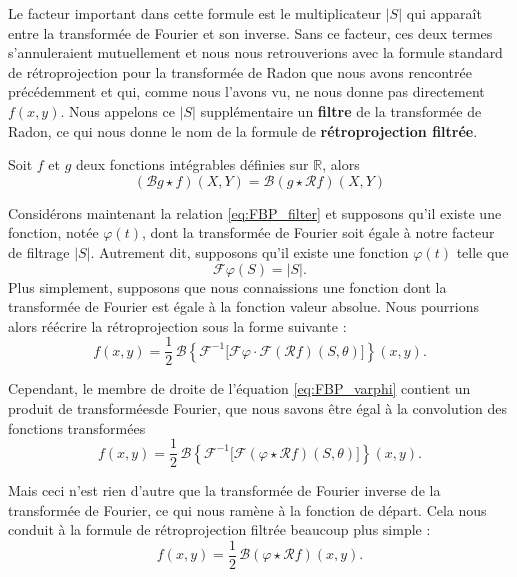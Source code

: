 Le facteur important dans cette formule est le multiplicateur $|S|$ qui apparaît entre la transformée de Fourier et son inverse. Sans ce facteur, ces deux termes s'annuleraient mutuellement et nous nous retrouverions avec la formule standard de rétroprojection pour la transformée de Radon que nous avons rencontrée précédemment et qui, comme nous l'avons vu, ne nous donne pas directement $f(x, y)$. Nous appelons ce $|S|$ supplémentaire un \textbf{filtre} de la transformée de Radon, ce qui nous donne le nom de la formule de \textbf{rétroprojection filtrée}.
\begin{proposition}
    Soit $f$ et $g$ deux fonctions intégrables définies sur $\mathbb{R}$, alors
    \begin{equation}
        (\mathcal{B}g\star f)(X, Y) = \mathcal{B}(g\star \mathcal{R}f)(X, Y)
    \end{equation}
\end{proposition}
Considérons maintenant la relation \eqref{eq:FBP_filter} et 
supposons qu'il existe une fonction, notée $\varphi(t)$, dont la transformée de Fourier
soit égale à notre facteur de filtrage $|S|$. Autrement dit, supposons qu'il existe une
fonction $\varphi(t)$ telle que
\begin{equation}
    \mathcal{F}\varphi(S) = |S|.
\end{equation}
Plus simplement, supposons que nous connaissions une fonction dont la transformée de
Fourier est égale à la fonction valeur absolue. Nous pourrions alors réécrire la
rétroprojection sous la forme suivante :
\begin{equation}
    f(x,y) = \frac{1}{2}\,\mathcal{B}
    \left\{
    \mathcal{F}^{-1}
    \bigl[
    \mathcal{F}\varphi \cdot \mathcal{F}(\mathcal{R}f)(S,\theta)
    \bigr]
    \right\}(x,y).
    \label{eq:FBP_varphi}
\end{equation}

Cependant, le membre de droite de l'équation \eqref{eq:FBP_varphi} contient un produit de transforméesde Fourier, que nous savons être égal à la convolution des fonctions transformées
\begin{equation}
    f(x,y)
    =
    \frac{1}{2}\,\mathcal{B}
    \left\{
    \mathcal{F}^{-1}
    \bigl[
    \mathcal{F}(\varphi \star \mathcal{R}f)(S,\theta)
    \bigr]
    \right\}(x,y).
\end{equation}

Mais ceci n'est rien d'autre que la transformée de Fourier inverse de la transformée
de Fourier, ce qui nous ramène à la fonction de départ. Cela nous conduit à la formule
de rétroprojection filtrée beaucoup plus simple :
\begin{equation}
    f(x,y) = \frac{1}{2}\,\mathcal{B}(\varphi \star \mathcal{R}f)(x,y).
    \label{eq:FBP_varphi_simple}
\end{equation}

